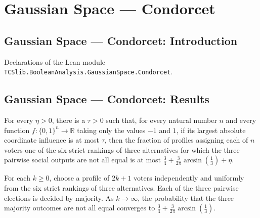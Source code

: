 \section{Gaussian Space --- Condorcet}
\subsection*{Gaussian Space --- Condorcet: Introduction}

Declarations of the Lean module \texttt{TCSlib.BooleanAnalysis.GaussianSpace.Condorcet}.

\subsection*{Gaussian Space --- Condorcet: Results}

\begin{theorem}
\label{BooleanAnalysis.GaussianSpace.condorcet_rationality_small_influences}
\leanok
{}
For every $\eta>0$, there is a $\tau>0$ such that, for every natural number $n$ and
every function $f:\{0,1\}^n\to\mathbb R$ taking only the values $-1$ and $1$, if its
largest absolute coordinate influence is at most $\tau$, then the fraction of profiles
assigning each of $n$ voters one of the six strict rankings of three alternatives for
which the three pairwise social outputs are not all equal is at most
$\frac34+\frac{3}{2\pi}\arcsin(\frac13)+\eta$.
\end{theorem}

\begin{theorem}
\label{BooleanAnalysis.GaussianSpace.majority_condorcet_rationality_tendsto}
\leanok
{}
For each $k\ge 0$, choose a profile of $2k+1$ voters independently and uniformly from
the six strict rankings of three alternatives. Each of the three pairwise elections is
decided by majority. As $k\to\infty$, the probability that the three majority outcomes
are not all equal converges to $\frac34+\frac{3}{2\pi}\arcsin\!\left(\frac13\right)$.
\end{theorem}
